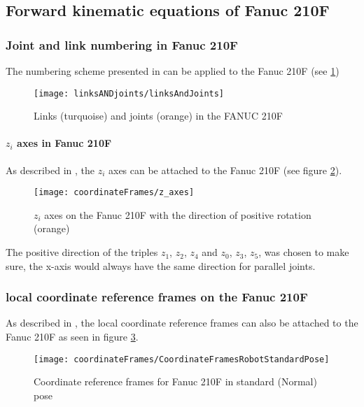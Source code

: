 \subsection{Forward kinematic equations of Fanuc 210F}

\subsubsection{Joint and link numbering in Fanuc 210F}
The numbering scheme presented in  can be applied to the Fanuc 210F (see \ref{fig:LinksANDJoints210F}) 


\begin{figure}[H]
	\texttt{[image: linksANDjoints/linksAndJoints]}
	\caption{Links (turquoise) and joints (orange) in the FANUC 210F}
	\label{fig:LinksANDJoints210F}
\end{figure}

\paragraph{$z_i$ axes in Fanuc 210F}
As described in , the $z_i$ axes can be attached to the Fanuc 210F (see figure \ref{fig:zi_Axes}).


\begin{figure}[H]
	\texttt{[image: coordinateFrames/z\_axes]}
	\caption{$z_i$ axes on the Fanuc 210F with the direction of positive rotation (orange)}
	\label{fig:zi_Axes}
\end{figure}


The positive direction of the triples $z_1$, $z_2$, $z_4$ and $z_0$, $z_3$, $z_5$, was chosen to make sure, the x-axis would always have the same direction for parallel joints. 

\subsubsection{local coordinate reference frames on the Fanuc 210F}

As described in , the local coordinate reference frames can also be attached to the Fanuc 210F as seen in figure \ref{fig:RefFrame}. 

\begin{figure}[H]
	\texttt{[image: coordinateFrames/CoordinateFramesRobotStandardPose]}
	\caption{Coordinate reference frames for Fanuc 210F in standard (Normal) pose}
	\label{fig:RefFrame}
\end{figure}


